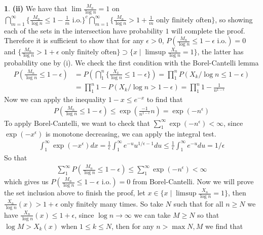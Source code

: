 \documentclass[10.5pt]{article}
\theoremstyle{definition}
\newtheorem{pb}{}
\newcommand{\set}[1]{\{#1\}}
\begin{document}
\begin{pb}
        \textbf{(ii)} We have that \(\lim \frac{M_n}{\log n} = 1\) on \(\bigcap_{m=1}^\infty \set{\frac{M_n}{\log n} \leq 1 - \frac{1}{m} \text{ i.o.}}^c \bigcap_{m=1}^\infty \set{\frac{M_n}{\log n} > 1 + \frac{1}{m} \text{ only finitely often}}\), so showing each of the sets in the intersection have probability \(1\) will complete the proof. Therefore it is sufficient to show that for any \(\epsilon > 0\), \(P(\frac{M_n}{\log n} \leq 1 - \epsilon \text{ i.o.}) = 0\) and \(\set{\frac{M_n}{\log n} > 1 + \epsilon \text{ only finitely often}} \supset \set{x \mid \limsup \frac{X_n}{\log n} = 1}\), the latter has probability one by (i). We check the first condition with the Borel-Cantelli lemma
        \begin{align*}
            P\left(\frac{M_n}{\log n} \leq 1 - \epsilon\right) &= P\left(\bigcap_1^n \set{\frac{X_k}{\log n} \leq 1 - \epsilon}\right) = \prod_1^n P\left(X_k/\log n \leq 1 - \epsilon\right) \\
            &= \prod_1^n 1 - P\left( X_k/\log n > 1 - \epsilon\right) = \prod_1^n 1 - \frac{1}{n^{1-\epsilon}}
        \end{align*}
        Now we can apply the inequality \(1-x \leq e^{-x}\) to find that
        \begin{align*}
            P\left(\frac{M_n}{\log n} \leq 1 - \epsilon\right) \leq \exp\left(\frac{-1}{n^{1-\epsilon}}n\right) = \exp(-n^\epsilon)
        \end{align*}
        To apply Borel-Cantelli, we want to check that \(\sum_1^\infty \exp(-n^\epsilon) < \infty\), since \(\exp(-x^\epsilon)\) is monotone decreasing, we can apply the integral test.
        \begin{align*}
            \int_1^\infty \exp(-x^\epsilon)dx = \frac{1}{\epsilon}\int_1^\infty e^{-u}u^{1/\epsilon - 1}du \leq \frac{1}{\epsilon}\int_1^\infty e^{-u}du = 1/\epsilon
        \end{align*}
        So that
        \begin{align*}
            \sum_1^\infty P\left(\frac{M_n}{\log n} \leq 1 - \epsilon\right) \leq \sum_1^\infty \exp(-n^\epsilon) < \infty
        \end{align*}
        which gives us \(P\left(\frac{M_n}{\log n} \leq 1 - \epsilon \text{ i.o.}\right) = 0\) from Borel-Cantelli. Now we will prove the set inclusion above to finish the proof, let \(x \in \set{x \mid \limsup \frac{X_n}{\log n} = 1}\), then \(\frac{X_n}{\log n}(x) > 1 + \epsilon\) only finitely many times. So take \(N\) such that for all \(n \geq N\) we have \(\frac{X_n}{\log n}(x) \leq 1 + \epsilon\), since \(\log n \to \infty\) we can take \(M \geq N\) so that \(\log M > X_k(x)\) when \(1 \leq k \leq N\), then for any \(n > \max{N,M}\) we find that

\end{pb}
\end{document}

